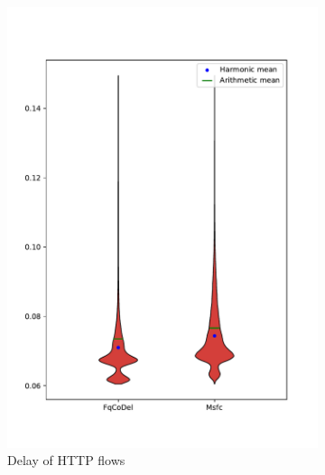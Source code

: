 \begin{figure}
\begin{subfigure}[b]{0.475\textwidth}
		\includegraphics[width=\textwidth]{drawings/type4-delay-down}
		\caption[]%
		{{\small Delay of HTTP flows}}    
		\label{fig:delay_http}
	\end{subfigure}
	\quad
	\begin{subfigure}[b]{0.475\textwidth}   
		\centering 

\end{subfigure}
\end{figure}
